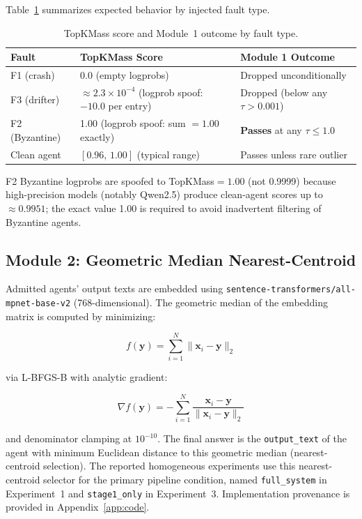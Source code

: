\documentclass[11pt]{article}
\begin{document}
Table~\ref{tab:fault-scores} summarizes expected behavior by injected fault type.

\begin{table}[h]
\centering
\caption{TopKMass score and Module~1 outcome by fault type.}
\label{tab:fault-scores}
\small
\begin{tabular}{llp{6cm}}
\toprule
\textbf{Fault} & \textbf{TopKMass Score} & \textbf{Module 1 Outcome} \\
\midrule
F1 (crash)
  & 0.0 (empty logprobs)
  & Dropped unconditionally \\
F3 (drifter)
  & ${\approx}2.3{\times}10^{-4}$ (logprob spoof: $-10.0$ per entry)
  & Dropped (below any $\tau > 0.001$) \\
F2 (Byzantine)
  & 1.00 (logprob spoof: sum $= 1.00$ exactly)
  & \textbf{Passes} at any $\tau \leq 1.0$ \\
Clean agent
  & $[0.96,\,1.00]$ (typical range)
  & Passes unless rare outlier \\
\bottomrule
\end{tabular}
\end{table}

F2 Byzantine logprobs are spoofed to TopKMass$=1.00$ (not 0.9999) because
high-precision models (notably Qwen2.5) produce clean-agent scores up to
${\approx}0.9951$; the exact value 1.00 is required to avoid inadvertent
filtering of Byzantine agents.

\subsection{Module 2: Geometric Median Nearest-Centroid}
\label{sec:module2}

Admitted agents' output texts are embedded using
\texttt{sentence-transformers/all-mpnet-base-v2} (768-dimensional). The
geometric median of the embedding matrix is computed by minimizing:

\begin{equation}
f(\mathbf{y}) = \sum_{i=1}^{N} \|\mathbf{x}_i - \mathbf{y}\|_2
\label{eq:geomed}
\end{equation}

via L-BFGS-B with analytic gradient:

\begin{equation}
\nabla f(\mathbf{y}) = -\sum_{i=1}^{N}
  \frac{\mathbf{x}_i - \mathbf{y}}{\|\mathbf{x}_i - \mathbf{y}\|_2}
\label{eq:geomed-grad}
\end{equation}

and denominator clamping at $10^{-10}$. The final answer is the
\texttt{output\_text} of the agent with minimum Euclidean distance to this
geometric median (nearest-centroid selection). The reported homogeneous
experiments use this nearest-centroid selector for the primary pipeline
condition, named \texttt{full\_system} in Experiment~1 and \texttt{stage1\_only}
in Experiment~3. Implementation provenance is provided in Appendix~\ref{app:code}.
\end{document}

